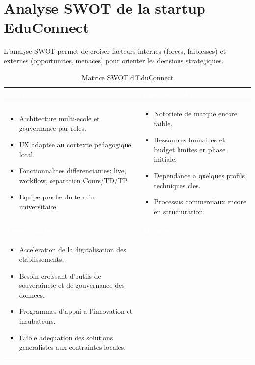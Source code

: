 ﻿\documentclass[12pt,a4paper,oneside]{report}
\begin{document}
\section{Analyse SWOT de la startup EduConnect}

L'analyse SWOT permet de croiser facteurs internes (forces, faiblesses) et externes (opportunites, menaces) pour orienter les decisions strategiques.

\renewcommand{\arraystretch}{1.45}
\begin{table}[H]
\centering
\caption{Matrice SWOT d'EduConnect}
\label{tab:swot_edconnect}
\begin{tabular}{|p{6.2cm}|p{6.2cm}|}
\hline
\rowcolor{ustoblue}
\textcolor{white}{\textbf{Forces (S)}} & \textcolor{white}{\textbf{Faiblesses (W)}} \\
\hline
\begin{itemize}
  \item Architecture multi-ecole et gouvernance par roles.
  \item UX adaptee au contexte pedagogique local.
  \item Fonctionnalites differenciantes: live, workflow, separation Cours/TD/TP.
  \item Equipe proche du terrain universitaire.
\end{itemize}
&
\begin{itemize}
  \item Notoriete de marque encore faible.
  \item Ressources humaines et budget limites en phase initiale.
  \item Dependance a quelques profils techniques cles.
  \item Processus commerciaux encore en structuration.
\end{itemize}
\\
\hline
\rowcolor{ustoblue}
\textcolor{white}{\textbf{Opportunites (O)}} & \textcolor{white}{\textbf{Menaces (T)}} \\
\hline
\begin{itemize}
  \item Acceleration de la digitalisation des etablissements.
  \item Besoin croissant d'outils de souverainete et de gouvernance des donnees.
  \item Programmes d'appui a l'innovation et incubateurs.
  \item Faible adequation des solutions generalistes aux contraintes locales.

\end{itemize}
\end{tabular}
\end{table}
\end{document}
